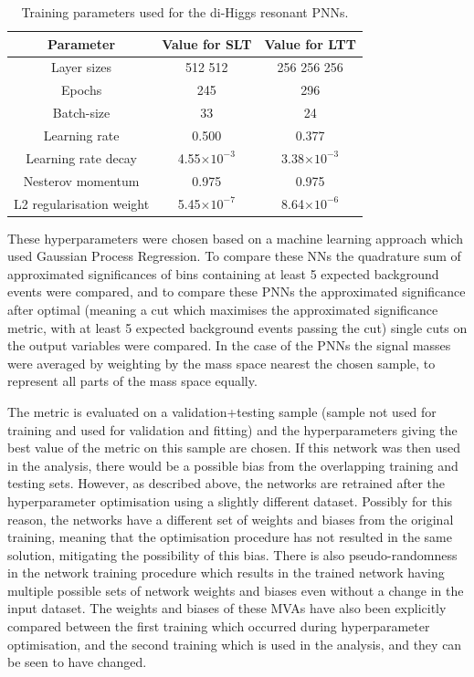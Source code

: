\begin{table}
  \centering
  \small
  \begin{tabular}{|c|c|c|}
    \hline
    Parameter & Value for SLT & Value for LTT\\
    \hline
    Layer sizes & 512 512 & 256 256 256\\
    Epochs & 245 & 296\\
    Batch-size & 33 & 24\\
    Learning rate & 0.500 & 0.377\\
    Learning rate decay & 4.55$\times 10^{-3}$ & 3.38$\times 10^{-3}$\\
    Nesterov momentum & 0.975 & 0.975\\
    L2 regularisation weight & 5.45$\times 10^{-7}$ & 8.64$\times 10^{-6}$\\
    \hline
  \end{tabular}
  \caption{Training parameters used for the di-Higgs \lephad resonant PNNs.}
  \label{tab:parameters_PNN_LepHad}
\end{table}


These hyperparameters were chosen based on a machine learning approach which used Gaussian Process Regression. To compare these NNs the quadrature sum of approximated significances of bins containing at least 5 expected background events were compared, and to compare these PNNs the approximated significance after optimal (meaning a cut which maximises the approximated significance metric, with at least 5 expected background events passing the cut) single cuts on the output variables were compared. In the case of the PNNs the signal masses were averaged by weighting by the mass space nearest the chosen sample, to represent all parts of the mass space equally.

The metric is evaluated on a validation+testing sample (sample not used for training and used for validation and fitting) and the hyperparameters giving the best 
value of the metric on this sample are chosen. If this network was then used in the analysis, there would be a possible bias from the overlapping training and testing sets.
However, as described above, the networks are retrained after the hyperparameter optimisation using a slightly different dataset.
Possibly for this reason, the networks have a different set of weights and biases from the original training, meaning that the optimisation procedure has not resulted in the same solution, mitigating the possibility of this bias.
There is also pseudo-randomness in the network training procedure which results in the trained network having multiple possible sets of network weights and biases even without a change in the input dataset. The weights and biases of these MVAs have also been explicitly compared between the first training which occurred during hyperparameter optimisation, and the second training which is used in the analysis, and they can be seen to have changed.

